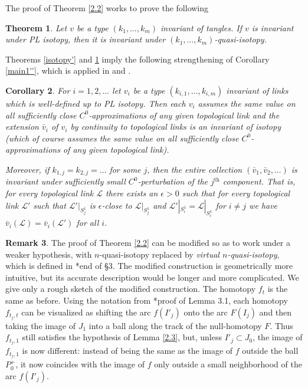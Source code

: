 \documentclass[a4paper,12pt,reqno,oneside]{amsart} %
\theoremstyle{plain}
\newtheorem{theorem}{Theorem}[section]
\newtheorem{corollary}[theorem]{Corollary}
\theoremstyle{definition}
\newtheorem{remark}[theorem]{Remark}
\theoremstyle{named}
\renewcommand{\:}{\colon}
\def\L{\mathcal{L}}
\begin{document}
The proof of Theorem \ref{2.2} works to prove the following

\begin{theorem}\label{2.2'} Let $v$ be a type $(k_1,\dots,k_m)$ invariant of tangles.
If $v$ is invariant under PL isotopy, then it is invariant under $(k_1,\dots,k_m)$-quasi-isotopy.
\end{theorem}

Theorems \ref{isotopy'} and \ref{2.2'} imply the following strengthening of Corollary \ref{main1''},
which is applied in \cite{M24-2} and \cite{M24-3}.

\begin{corollary} \label{perturbation}
For $i=1,2,\dots$ let $v_i$ be a type $(k_{i,1},\dots,k_{i,m})$ invariant of links which is well-defined up to PL isotopy.
Then each $v_i$ assumes the same value on all sufficiently close $C^0$-approximations of any given topological link
and the extension $\bar v_i$ of $v_i$ by continuity to topological links is an invariant of isotopy 
(which of course assumes the same value on all sufficiently close $C^0$-approximations of any given topological link).

Moreover, if $k_{1,j}=k_{2,j}=\dots$ for some $j$, then the entire collection $(\bar v_1,\bar v_2,\dots)$ is invariant 
under sufficiently small $C^0$-perturbation of the $j^{\text{th}}$ component. 
That is, for every topological link $\L$ there exists an $\epsilon>0$ such that for every topological link $\L'$ 
such that $\L'|_{S^1_j}$ is $\epsilon$-close to $\L|_{S^1_j}$ and $\L'|_{S^1_i}=\L|_{S^1_i}$ for $i\ne j$ we have 
$\bar v_i(\L)=\bar v_i(\L')$ for all $i$.
\end{corollary}

\begin{remark} The proof of Theorem \ref{2.2} can be modified so as to work under a weaker hypothesis, with $n$-quasi-isotopy
replaced by {\it virtual $n$-quasi-isotopy}, which is defined in \cite{MR1}*{end of \S3}.
The modified construction is geometrically more intuitive, but its accurate description would be longer and more complicated.
We give only a rough sketch of the modified construction.
The homotopy $f_t$ is the same as before.
Using the notation from \cite{MR1}*{proof of Lemma 3.1}, each homotopy $f_{t_j,t}$ can be visualized as shifting the arc
$f(I'_j)$ onto the arc $F(I_j)$ and then taking the image of $J_1$ into a ball along the track of the null-homotopy $F$.
Thus $f_{t_j,1}$ still satisfies the hypothesis of Lemma \ref{2.3}, but, unless $I'_j\subset J_0$, the image of $f_{t_j,1}$ 
is now different: instead of being the same as the image of $f$ outside the ball $P_0^+$, it now coincides with the image 
of $f$ only outside a small neighborhood of the arc $f(I'_j)$.
\end{remark}
\end{document}
